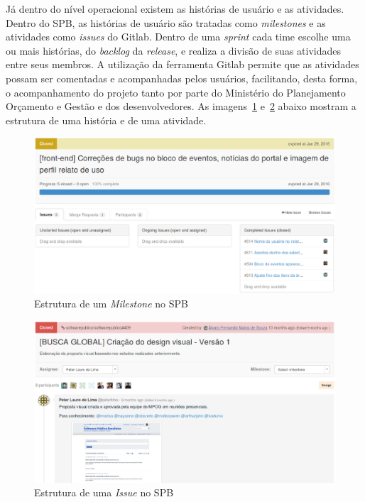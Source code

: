 Já dentro do nível operacional existem as histórias de usuário e as atividades. Dentro do SPB, as histórias de usuário são tratadas como \textit{milestones}  e as atividades como \textit{issues} do Gitlab. Dentro de uma \textit{sprint} cada time escolhe uma ou mais  histórias, do \textit{backlog} da \textit{release}, e realiza a divisão de suas atividades entre seus membros. A utilização da ferramenta Gitlab permite que as atividades possam ser comentadas e acompanhadas pelos usuários, facilitando, desta forma, o acompanhamento do projeto tanto por parte do Ministério do Planejamento Orçamento e Gestão e dos desenvolvedores. As imagens~\ref{fig:milestone} e~\ref{fig:issue} abaixo mostram a estrutura de uma história e de uma atividade.

\begin{figure}[!h]
    \centering
        \includegraphics[keepaspectratio=true,scale=0.5]{figuras/milestone.eps}
    \caption{Estrutura de um \textit{Milestone} no SPB}
    \label{fig:milestone}
\end{figure}


\begin{figure}[!h]
    \centering
        \includegraphics[keepaspectratio=true,scale=0.5]{figuras/issue.eps}
    \caption{Estrutura de uma \textit{Issue} no SPB}
    \label{fig:issue}
\end{figure}

